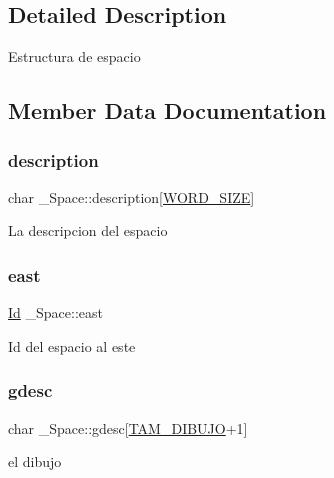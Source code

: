 \subsection{Detailed Description}
Estructura de espacio 

\subsection{Member Data Documentation}
\mbox{\label{struct__Space_a2a50aacb78d1d0f65f5b14f94ed81d80}} 
\subsubsection{\texorpdfstring{description}{description}}
{\footnotesize\ttfamily char \+\_\+\+Space\+::description\mbox{[}\hyperlink{types_8h_a92ed8507d1cd2331ad09275c5c4c1c89}{W\+O\+R\+D\+\_\+\+S\+I\+ZE}\mbox{]}}

La descripcion del espacio \mbox{\label{struct__Space_a41ce2bf33cf0c157b358221f094ee05b}} 
\subsubsection{\texorpdfstring{east}{east}}
{\footnotesize\ttfamily \hyperlink{types_8h_a845e604fb28f7e3d97549da3448149d3}{Id} \+\_\+\+Space\+::east}

Id del espacio al este \mbox{\label{struct__Space_af311939768f2208925e07a50ebd3f045}} 
\subsubsection{\texorpdfstring{gdesc}{gdesc}}
{\footnotesize\ttfamily char \+\_\+\+Space\+::gdesc\mbox{[}\hyperlink{space_8h_a894ebc9b2098fe63607e0ca2e5f5ce8d}{T\+A\+M\+\_\+\+D\+I\+B\+U\+JO}+1\mbox{]}}

el dibujo \mbox{\label{struct__Space_a70cb461deb9ac073e401b607339b567f}} 
